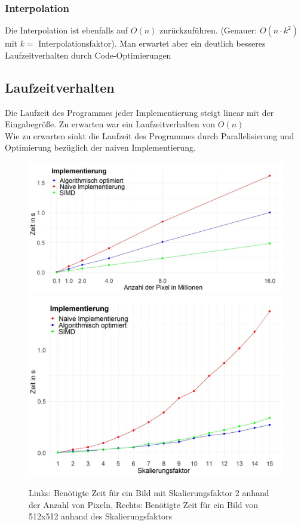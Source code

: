 \documentclass[course=erap]{aspdoc}
\begin{document}
\subsubsection{Interpolation}
Die Interpolation ist ebenfalls auf $O(n)$ zurückzuführen. (Genauer: $O(n \cdot k^{2})$ mit $k =$ Interpolationsfaktor). Man erwartet aber ein deutlich besseres Laufzeitverhalten durch Code-Optimierungen

\subsection{Laufzeitverhalten}
Die Laufzeit des Programmes jeder Implementierung steigt linear mit der Eingabegröße. Zu erwarten war ein Laufzeitverhalten von $O(n)$\\
Wie zu erwarten sinkt die Laufzeit des Programmes durch Parallelisierung und Optimierung bezüglich der naiven Implementierung.

\begin{figure}[ht]
    \centering
    \includegraphics[scale=0.125]{assets/speed.png}
    \includegraphics[scale=0.125]{assets/speed2.png}
    \caption{Links: Benötigte Zeit für ein Bild mit Skalierungsfaktor 2 anhand der Anzahl von Pixeln, Rechts: Benötigte Zeit für ein Bild von 512x512 anhand des Skalierungsfaktors}
    \label{fig:speed}
\end{figure}
\end{document}
